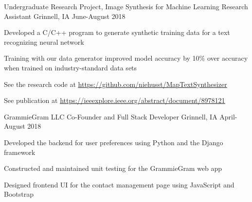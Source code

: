 \documentclass[12pt, a4paper]{awesome-cv}
\begin{document}
\begin{cventries}
  \cventry
    {Undergraduate Research Project, Image Synthesis for Machine Learning}
    {Research Assistant}
    {Grinnell, IA}
    {June-August 2018}
    {
      \begin{cvitems}
        \item{Developed a C/C++ program to generate synthetic training data for a text recognizing neural network}
        \item{Training with our data generator improved model accuracy by 10\% over accuracy when trained on industry-standard data sets}
	      \item{See the research code at \underline{\href{https://github.com/niehusst/MapTextSynthesizer}{https://github.com/niehusst/MapTextSynthesizer}}}
	      \item{See publication at \underline{\href{https://ieeexplore.ieee.org/abstract/document/8978121}{https://ieeexplore.ieee.org/abstract/document/8978121}}}
      \end{cvitems}
    }




  \cventry
    {GrammieGram LLC}
    {Co-Founder and Full Stack Developer}
    {Grinnell, IA}
    {April-August 2018}
    {
      \begin{cvitems}
        \item {Developed the backend for user preferences using Python and the Django framework}
        \item {Constructed and maintained unit testing for the GrammieGram web app}
        \item {Designed frontend UI for the contact management page using JavaScript and Bootstrap}
      \end{cvitems}
    }

\end{cventries}
\end{document}
